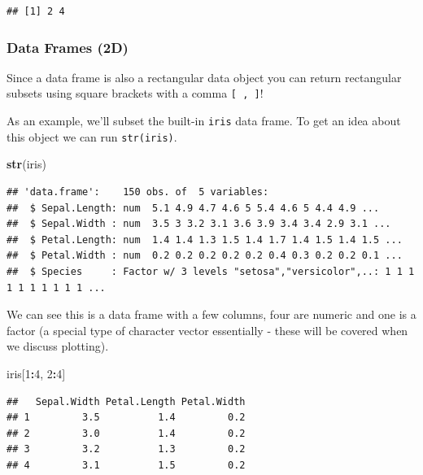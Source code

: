 \documentclass[
]{book}
\newenvironment{Shaded}{\begin{snugshade}}{\end{snugshade}}
\newcommand{\DecValTok}[1]{\textcolor[rgb]{0.00,0.00,0.81}{#1}}
\newcommand{\KeywordTok}[1]{\textcolor[rgb]{0.13,0.29,0.53}{\textbf{#1}}}
\newcommand{\NormalTok}[1]{#1}
\newcommand{\OperatorTok}[1]{\textcolor[rgb]{0.81,0.36,0.00}{\textbf{#1}}}
\theoremstyle{definition}
\theoremstyle{definition}
\theoremstyle{definition}
\theoremstyle{remark}
\begin{document}
\begin{verbatim}
## [1] 2 4
\end{verbatim}

\hypertarget{data-frames-2d}{%
\subsubsection{Data Frames (2D)}\label{data-frames-2d}}

Since a data frame is also a rectangular data object you can return rectangular subsets using square brackets with a comma \texttt{{[}\ ,\ {]}}!

As an example, we'll subset the built-in \texttt{iris} data frame. To get an idea about this object we can run \texttt{str(iris)}.

\begin{Shaded}
\begin{Highlighting}[]
\KeywordTok{str}\NormalTok{(iris)}
\end{Highlighting}
\end{Shaded}

\begin{verbatim}
## 'data.frame':    150 obs. of  5 variables:
##  $ Sepal.Length: num  5.1 4.9 4.7 4.6 5 5.4 4.6 5 4.4 4.9 ...
##  $ Sepal.Width : num  3.5 3 3.2 3.1 3.6 3.9 3.4 3.4 2.9 3.1 ...
##  $ Petal.Length: num  1.4 1.4 1.3 1.5 1.4 1.7 1.4 1.5 1.4 1.5 ...
##  $ Petal.Width : num  0.2 0.2 0.2 0.2 0.2 0.4 0.3 0.2 0.2 0.1 ...
##  $ Species     : Factor w/ 3 levels "setosa","versicolor",..: 1 1 1 1 1 1 1 1 1 1 ...
\end{verbatim}

We can see this is a data frame with a few columns, four are numeric and one is a factor (a special type of character vector essentially - these will be covered when we discuss plotting).

\begin{Shaded}
\begin{Highlighting}[]
\NormalTok{iris[}\DecValTok{1}\OperatorTok{:}\DecValTok{4}\NormalTok{, }\DecValTok{2}\OperatorTok{:}\DecValTok{4}\NormalTok{]}
\end{Highlighting}
\end{Shaded}

\begin{verbatim}
##   Sepal.Width Petal.Length Petal.Width
## 1         3.5          1.4         0.2
## 2         3.0          1.4         0.2
## 3         3.2          1.3         0.2
## 4         3.1          1.5         0.2
\end{verbatim}
\end{document}
